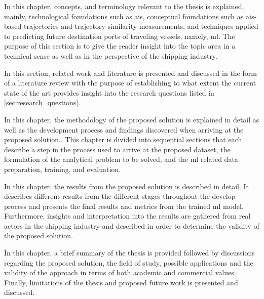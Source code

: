 
In this chapter, concepts, and terminology relevant to the thesis is explained, mainly, technological foundations such as \acrfull{ais}, conceptual foundations such as \acrshort{ais}-based trajectories and trajectory similarity measurements, and techniques applied to predicting future destination ports of traveling vessels, namely, \acrfull{ml}. The purpose of this section is to give the reader insight into the topic area in a technical sense as well as in the perspective of the shipping industry.


In this section, related work and literature is presented and discussed in the form of a literature review with the purpose of establishing to what extent the current state of the art provides insight into the research questions listed in \cref{sec:research_questions}.


In this chapter, the methodology of the proposed solution is explained in detail as well as the development process and findings discovered when arriving at the proposed solution.. This chapter is divided into sequential sections that each describe a step in the process used to arrive at the proposed dataset, the formulation of the analytical problem to be solved, and the \acrfull{ml} related data preparation, training, and evaluation.


In this chapter, the results from the proposed solution is described in detail. It describes different results from the different stages throughout the develop process and presents the final results and metrics from the trained \acrfull{ml} model. Furthermore, insights and interpretation into the results are gathered from real actors in the shipping industry and described in order to determine the validity of the proposed solution.


In this chapter, a brief summary of the thesis is provided followed by discussions regarding the proposed solution, the field of study, possible applications and the validity of the approach in terms of both academic and commercial values. Finally, limitations of the thesis and proposed future work is presented and discussed.

